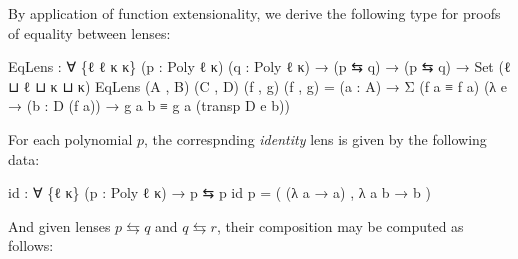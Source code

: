 \documentclass[
  11pt,
  oneside,
  article]{memoir}
\newenvironment{Shaded}{}{}
\newcommand{\DataTypeTok}[1]{\textcolor[rgb]{0.56,0.13,0.00}{#1}}
\newcommand{\NormalTok}[1]{#1}
\newcommand{\OtherTok}[1]{\textcolor[rgb]{0.00,0.44,0.13}{#1}}
\theoremstyle{definition}
\theoremstyle{plain}
\newcommand{\0}{\textsf{0}}
\newcommand{\1}{\tn{\textsf{1}}}
\begin{document}
By application of function extensionality, we derive the following type
for proofs of equality between lenses:

\begin{Shaded}
\begin{Highlighting}[]
\NormalTok{EqLens }\OtherTok{:} \OtherTok{∀} \OtherTok{\{}\NormalTok{ℓ ℓ\textquotesingle{} κ κ\textquotesingle{}}\OtherTok{\}} \OtherTok{(}\NormalTok{p }\OtherTok{:}\NormalTok{ Poly ℓ κ}\OtherTok{)} \OtherTok{(}\NormalTok{q }\OtherTok{:}\NormalTok{ Poly ℓ\textquotesingle{} κ\textquotesingle{}}\OtherTok{)}
         \OtherTok{→} \OtherTok{(}\NormalTok{p ⇆ q}\OtherTok{)} \OtherTok{→} \OtherTok{(}\NormalTok{p ⇆ q}\OtherTok{)} \OtherTok{→} \DataTypeTok{Set} \OtherTok{(}\NormalTok{ℓ ⊔ ℓ\textquotesingle{} ⊔ κ ⊔ κ\textquotesingle{}}\OtherTok{)}
\NormalTok{EqLens }\OtherTok{(}\NormalTok{A , B}\OtherTok{)} \OtherTok{(}\NormalTok{C , D}\OtherTok{)} \OtherTok{(}\NormalTok{f , g}\OtherTok{)} \OtherTok{(}\NormalTok{f\textquotesingle{} , g\textquotesingle{}}\OtherTok{)} \OtherTok{=} 
  \OtherTok{(}\NormalTok{a }\OtherTok{:}\NormalTok{ A}\OtherTok{)} \OtherTok{→}\NormalTok{ Σ }\OtherTok{(}\NormalTok{f a ≡ f\textquotesingle{} a}\OtherTok{)} 
              \OtherTok{(λ}\NormalTok{ e }\OtherTok{→} \OtherTok{(}\NormalTok{b }\OtherTok{:}\NormalTok{ D }\OtherTok{(}\NormalTok{f a}\OtherTok{))} \OtherTok{→}\NormalTok{ g a b ≡ g\textquotesingle{} a }\OtherTok{(}\NormalTok{transp D e b}\OtherTok{))}
\end{Highlighting}
\end{Shaded}

For each polynomial \(p\), the correspnding \emph{identity} lens is
given by the following data:

\begin{Shaded}
\begin{Highlighting}[]
\NormalTok{id }\OtherTok{:} \OtherTok{∀} \OtherTok{\{}\NormalTok{ℓ κ}\OtherTok{\}} \OtherTok{(}\NormalTok{p }\OtherTok{:}\NormalTok{ Poly ℓ κ}\OtherTok{)} \OtherTok{→}\NormalTok{ p ⇆ p}
\NormalTok{id p }\OtherTok{=} \OtherTok{(} \OtherTok{(λ}\NormalTok{ a }\OtherTok{→}\NormalTok{ a}\OtherTok{)}\NormalTok{ , }\OtherTok{λ}\NormalTok{ a b }\OtherTok{→}\NormalTok{ b }\OtherTok{)}
\end{Highlighting}
\end{Shaded}

And given lenses \(p \leftrightarrows q\) and \(q \leftrightarrows r\),
their composition may be computed as follows:
\end{document}

